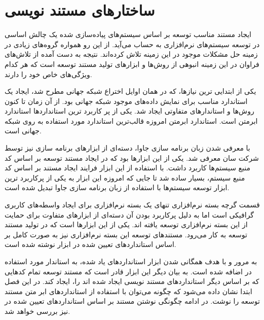 %
% 
% 
% 
%
\chapter{ساختارهای مستند نویسی}

ایجاد مستند مناسب توسعه بر اساس سیستم‌های پیاده‌سازی شده یک چالش اساسی در توسعه
سیستم‌های نرم‌افزاری به حساب می‌آید. از این رو همواره گروه‌های زیادی در زمینه حل
مشکلات موجود در این زمینه تلاش کرده‌اند. نتیجه به دست آمده از تلاش‌های فراوان در
این زمینه انبوهی از روش‌ها و ابزارهای تولید مستند توسعه است که هر کدام ویژگی‌های
خاص خود را دارند.

   یکی از ابتدایی ترین نیازها، که در همان اوایل اختراع شبکه جهانی مطرح شد، ایجاد
یک استاندارد
   مناسب برای نمایش داده‌های موجود شبکه جهانی بود. از آن زمان تا کنون روش‌ها و
استاندارهای
   متفاوتی ایجاد شد. یکی از پر کاربرد ترین استانداردها استاندارد ابرمتن
 است. استاندارد
   ابرمتن امروزه قالب‌ترین استاندارد مورد استفاده به روی شبکه جهانی است.

   با معرفی شدن زبان برنامه سازی جاوا، دسته‌ای از ابزارهای برنامه سازی نیز توسط
شرکت
   سان معرفی شد.  یکی از این ابزارها
   بود که
   در ایجاد مستند توسعه بر اساس کد منبع سیستم‌ها کاربرد داشت. با استفاده از این
ابزار فرایند
   ایجاد مستند بر اساس کد منبع سیستم، بسیار ساده شد تا جایی که امروزه این ابزار
به یکی از
   پرکاربرد ترین ابزار توسعه سیستم‌ها با استفاده از زبان برنامه سازی جاوا تبدیل
شده است.

قسمت
   گرچه بسته نرم‌افزاری  تنهای یک بسته نرم‌افزاری برای ایجاد واسطه‌های
کاربری گرافیکی
   است اما به دلیل پرکاربرد بودن آن دسته‌ای از ابزارهای متفاوت برای حمایت از این
بسته نرم‌افزاری
   توسعه یافته اند.  یکی از این ابزارها است که در تولید مستند توسعه
به کار می‌رود.
   مستندهای توسعه این بسته نرم‌افزاری نیز به صورت کامل بر اساس استانداردهای
تعیین شده در
   ابزار  نوشته شده است.

    به مرور  و با هدف همگانی شدن ابزار  استانداردهای یاد شده، به
استاندار مورد استفاده
    در   اضافه شده است. به بیان دیگر این ابزار قادر است که مستند
توسعه تمام کدهایی
    که بر اساس دیگر استانداردهای مستند نویسی ایجاد شده اند را، ایجاد کند. در این
فصل ابتدا نشان
    داده می‌شود که چگونه می‌توان با استفاده از استانداردهای ابر متن مستند توسعه
را نوشت. در ادامه
    چگونگی نوشتن مستند بر اساس استانداردهای تعیین شده در  نیز بررسی
خواهد شد.



 
